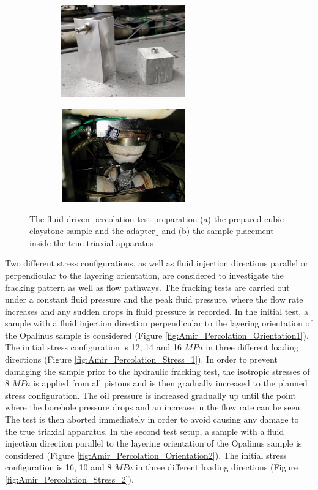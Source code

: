 \begin{figure}[!ht]
\begin{subfigure}[c]{0.48\textwidth}
\includegraphics[width=6cm,height=4cm]{figures/Amir_Percolation_Adapter.png}
\subcaption{}
\label{fig:Amir_Percolation_Adapter}
\end{subfigure}
\hfill
\begin{subfigure}[c]{0.48\textwidth}
\includegraphics[width=6cm,height=4cm]{figures/Amir_Percolation_Setup.png}
\subcaption{}
\label{fig:Amir_Percolation_Setup}
\end{subfigure}
\caption{The fluid driven percolation test preparation (a) the prepared cubic claystone sample and the adapter¸ and (b) the sample placement inside the true triaxial apparatus}
\end{figure}

Two different stress configurations, as well as fluid injection directions parallel or perpendicular to the layering orientation, are considered to investigate the fracking pattern as well as flow pathways. The fracking tests are carried out under a constant fluid pressure and the peak fluid pressure, where the flow rate increases and any sudden drops in fluid pressure is recorded. In the initial test, a sample with a fluid injection direction perpendicular to the layering orientation of the Opalinus sample is considered (Figure \ref{fig:Amir_Percolation_Orientation1}). The initial stress configuration is 12, 14 and 16 $MPa$ in three different loading directions (Figure \ref{fig:Amir_Percolation_Stress_1}). In order to prevent damaging the sample prior to the hydraulic fracking test, the isotropic stresses of 8 $MPa$ is applied from all pistons and is then gradually increased to the planned stress configuration. The oil pressure is increased gradually up until the point where the borehole pressure drops and an increase in the flow rate can be seen. The test is then aborted immediately in order to avoid causing any damage to the true triaxial apparatus. In the second test setup, a sample with a fluid injection direction parallel to the layering orientation of the Opalinus sample is considered (Figure \ref{fig:Amir_Percolation_Orientation2}). The initial stress configuration is 16, 10 and 8 $MPa$ in three different loading directions (Figure \ref{fig:Amir_Percolation_Stress_2}).

